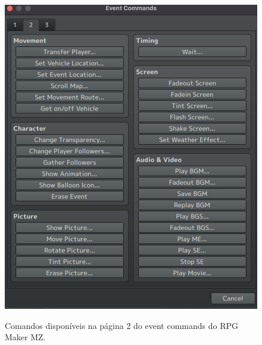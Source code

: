 \begin{itemize}
	      \begin{figure}[ht]
		      \centering
		      \caption{Comandos disponíveis na página 2 do event commands do RPG Maker MZ.}
		      \includegraphics[scale=0.3]{Textuais/Pictures/Event-commands-2.png}
		      \label{fig:rpgmaker-event-commands-2}
	      \end{figure}


\end{itemize}
